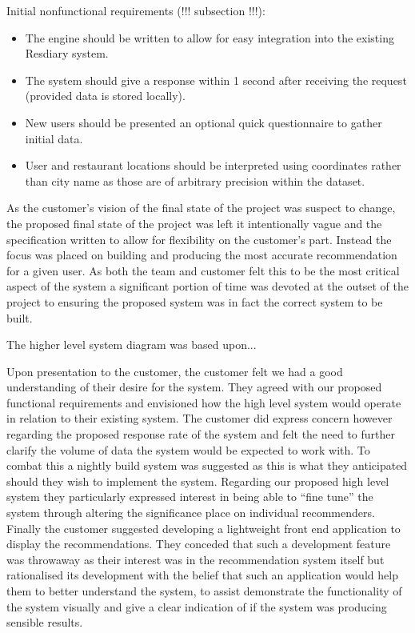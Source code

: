 \documentclass{l3proj}
\begin{document}
Initial nonfunctional requirements (!!! subsection !!!):
\begin{itemize}
\item The engine should be written to allow for easy integration into the existing Resdiary system.
\item The system should give a response within 1 second after receiving the request (provided data is stored locally).
\item New users should be presented an optional quick questionnaire to gather initial data.
\item User and restaurant locations should be interpreted using coordinates rather than city  name as those are of arbitrary precision within the dataset.
\end{itemize}

As the customer’s vision of the final state of the project was suspect to change, the proposed final state of the project was left it intentionally vague and the specification written to allow for flexibility on the customer’s part. Instead the focus was placed on building and producing the most accurate recommendation for a given user. As both the team and customer felt this to be the most critical aspect of the system a significant portion of time was devoted at the outset of the project to ensuring the proposed system was in fact the correct system to be built.

The higher level system diagram was based upon... 

Upon presentation to the customer, the customer felt we had a good understanding of their desire for the system. They agreed with our proposed functional requirements and envisioned how the high level system would operate in relation to their existing system. The customer did express concern however regarding the proposed response rate of the system and felt the need to further clarify the volume of data the system would be expected to work with. To combat this a nightly build system was suggested as this is what they anticipated should they wish to implement the system. Regarding our proposed high level system they particularly expressed interest in being able to “fine tune” the system through altering the significance place on individual recommenders. Finally the customer suggested developing a lightweight front end application to display the recommendations. They conceded that such a development feature was throwaway as their interest was in the recommendation system itself but rationalised its development with the belief that such an application would help them to better understand the system, to assist demonstrate the functionality of the system visually and give a clear indication of if the system was producing sensible results. 
\end{document}

